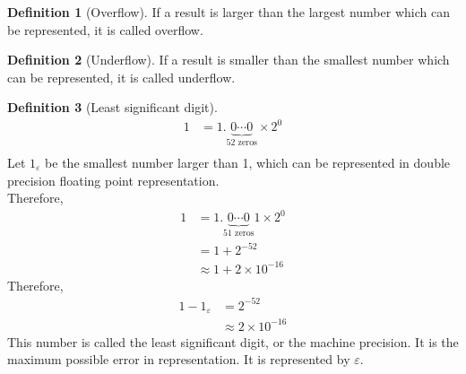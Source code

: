 \documentclass[fleqn, a4paper, 12pt, twoside]{article}
\theoremstyle{definition}
\newtheorem{definition}{Definition}
\theoremstyle{theorem}
\begin{document}
\begin{definition}[Overflow]
	If a result is larger than the largest number which can be represented, it is called overflow.
\end{definition}

\begin{definition}[Underflow]
	If a result is smaller than the smallest number which can be represented, it is called underflow.
\end{definition}

\begin{definition}[Least significant digit]
	\begin{align*}
		1 & = 1.\underbrace{0 \cdots 0}_{\text{52 zeros}} \times 2^0 \\
	\end{align*}
	Let $1_{\varepsilon}$ be the smallest number larger than 1, which can be represented in double precision floating point representation.\\
	Therefore,
	\begin{align*}
		1 & = 1.\underbrace{0 \cdots 0}_{\text{51 zeros}} 1 \times 2^0 \\
                  & = 1 + 2^{-52}                                              \\
                  & \approx 1 + 2 \times 10^{-16}
	\end{align*}
	Therefore,
	\begin{align*}
		1 - 1_{\varepsilon} & = 2^{-52} \\
                                    & \approx 2 \times 10^{-16}
	\end{align*}
	This number is called the least significant digit, or the machine precision.
	It is the maximum possible error in representation.
	It is represented by $\varepsilon$.
	\label{LSD}
\end{definition}
\end{document}

